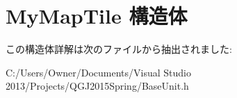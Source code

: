\hypertarget{struct_my_map_tile}{}\section{My\+Map\+Tile 構造体}
\label{struct_my_map_tile}


この構造体詳解は次のファイルから抽出されました\+:\begin{DoxyCompactItemize}
\item 
C\+:/\+Users/\+Owner/\+Documents/\+Visual Studio 2013/\+Projects/\+Q\+G\+J2015\+Spring/Base\+Unit.\+h\end{DoxyCompactItemize}
